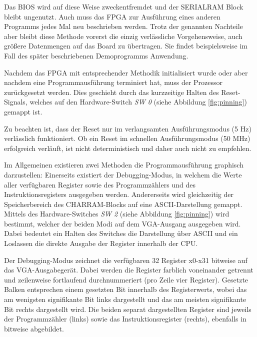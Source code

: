 Das BIOS wird auf diese Weise zweckentfremdet und der SERIALRAM Block bleibt ungenutzt. Auch muss das FPGA zur Ausf\"uhrung eines anderen Programms jedes Mal neu beschrieben werden. Trotz der genannten Nachteile aber bleibt diese Methode vorerst die einzig verl\"assliche Vorgehensweise, auch gr\"oßere Datenmengen auf das Board zu \"ubertragen. Sie findet beispielsweise im Fall des sp\"ater beschriebenen Demoprogramms Anwendung.


Nachdem das FPGA mit entsprechender Methodik initialisiert wurde oder aber nachdem eine Programmausf\"uhrung terminiert hat, muss der Prozessor zur\"uckgesetzt werden. Dies geschieht durch das kurzzeitige Halten des Reset-Signals, welches auf den Hardware-Switch \textit{SW 0} (siehe Abbildung \ref{fig:pinning}) gemappt ist.

Zu beachten ist, dass der Reset nur im verlangsamten Ausf\"uhrungsmodus (5 Hz) verl\"asslich funktioniert. Ob ein Reset im schnellen Ausf\"uhrungsmodus (50 MHz) erfolgreich verl\"auft, ist nicht deterministisch und daher auch nicht zu empfehlen.


Im Allgemeinen existieren zwei Methoden die Programmausf\"uhrung graphisch darzustellen: Einerseits existiert der Debugging-Modus, in welchem die Werte aller verf\"ugbaren Register sowie des Programmz\"ahlers und des Instruktionsregisters ausgegeben werden. Andererseits wird gleichzeitig der Speicherbereich des CHARRAM-Blocks auf eine ASCII-Darstellung gemappt. Mittels des Hardware-Switches \textit{SW 2} (siehe Abbildung \ref{fig:pinning}) wird bestimmt, welcher der beiden Modi auf dem VGA-Ausgang ausgegeben wird. Dabei bedeutet ein Halten des Switches die Darstellung \"uber ASCII und ein Loslassen die direkte Ausgabe der Register innerhalb der CPU.


Der Debugging-Modus zeichnet die verf\"ugbaren 32 Register x0-x31 bitweise auf das VGA-Ausgabeger\"at. Dabei werden die Register farblich voneinander getrennt und zeilenweise fortlaufend durchnummeriert (pro Zeile vier Register). Gesetzte Balken entsprechen einem gesetzten Bit innerhalb des Registerwerts, wobei das am wenigsten signifikante Bit links dargestellt und das am meisten signifikante Bit rechts dargestellt wird.
Die beiden separat dargestellten Register sind jeweils der Programmz\"ahler (links) sowie das Instruktionsregister (rechts), ebenfalls in bitweise abgebildet.

